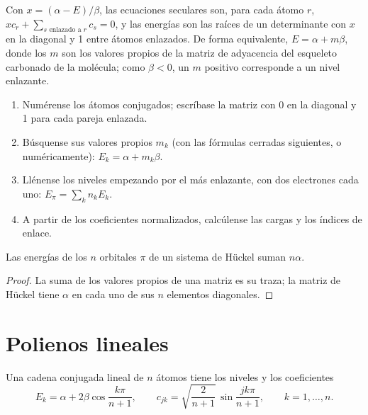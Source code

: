 Con $x = (\alpha - E)/\beta$, las ecuaciones seculares son, para cada átomo $r$,
$xc_r + \sum_{s \text{ enlazado a } r} c_s = 0$, y las energías son las raíces de un
determinante con $x$ en la diagonal y 1 entre átomos enlazados. De forma equivalente, $E =
\alpha + m\beta$, donde los $m$ son los valores propios de la matriz de adyacencia del
esqueleto carbonado de la molécula; como $\beta < 0$, un $m$ positivo corresponde a un nivel enlazante.

\begin{method}\label{met:b2:huckel:huckel}
\begin{enumerate}
  \item Numérense los átomos conjugados; escríbase la matriz con 0 en la diagonal y 1
        para cada pareja enlazada.
  \item Búsquense sus valores propios $m_k$ (con las fórmulas cerradas siguientes, o numéricamente): $E_k =
        \alpha + m_k\beta$.
  \item Llénense los niveles empezando por el más enlazante, con dos electrones cada uno:
        $E_\pi = \sum_k n_k E_k$.
  \item A partir de los coeficientes normalizados, calcúlense las cargas y los índices de enlace.
\end{enumerate}
\end{method}

\begin{proposition}[Traza]\label{prop:b2:huckel:trace}
Las energías de los $n$ orbitales $\pi$ de un sistema de Hückel suman $n\alpha$.
\end{proposition}

\begin{proof}
La suma de los valores propios de una matriz es su traza; la matriz de Hückel tiene $\alpha$
en cada uno de sus $n$ elementos diagonales.
\end{proof}

\section{Polienos lineales}

\begin{theorem}\label{thm:b2:huckel:polyene}
Una cadena conjugada lineal de $n$ átomos tiene los niveles y los coeficientes
\[
  E_k = \alpha + 2\beta\cos\frac{k\pi}{n + 1}, \qquad
  c_{jk} = \sqrt{\frac{2}{n + 1}}\,\sin\frac{jk\pi}{n + 1}, \qquad k = 1, \dots, n .
\]
\end{theorem}


